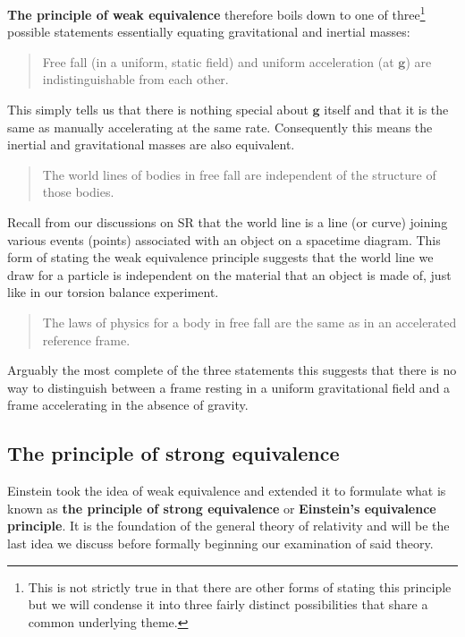 \documentclass[english,seminar]{lecture}
\begin{document}
\textbf{The principle of weak equivalence} therefore boils down to one of three\footnote{This is not strictly true in that there are other forms of stating this principle but we will condense it into three fairly distinct possibilities that share a common underlying theme.} possible statements essentially equating gravitational and inertial masses:
\begin{quote}
	Free fall (in a uniform, static field) and uniform acceleration (at $\mathbf{g}$) are indistinguishable from each other.
\end{quote}
This simply tells us that there is nothing special about $\mathbf{g}$ itself and that it is the same as manually accelerating at the same rate. Consequently this means the inertial and gravitational masses are also equivalent.
\begin{quote}
	The world lines of bodies in free fall are independent of the structure of those bodies.
\end{quote}
Recall from our discussions on SR that the world line is a line (or curve) joining various events (points) associated with an object on a spacetime diagram. This form of stating the weak equivalence principle suggests that the world line we draw for a particle is independent on the material that an object is made of, just like in our torsion balance experiment.
\begin{quote}
	The laws of physics for a body in free fall are the same as in an accelerated reference frame.
\end{quote}
Arguably the most complete of the three statements this suggests that there is no way to distinguish between a frame resting in a uniform gravitational field and a frame accelerating in the absence of gravity.

\subsection{The principle of strong equivalence}

Einstein took the idea of weak equivalence and extended it to formulate what is known as \textbf{the principle of strong equivalence} or \textbf{Einstein's equivalence principle}. It is the foundation of the general theory of relativity and will be the last idea we discuss before formally beginning our examination of said theory.
\end{document}
